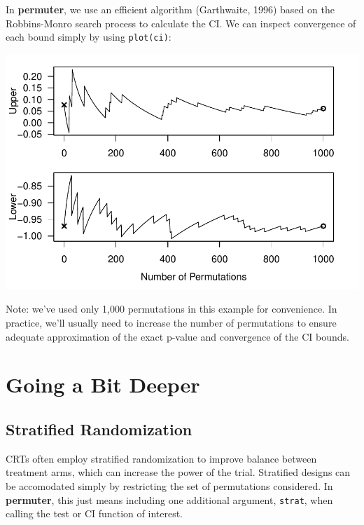 \documentclass[12pt]{article}\usepackage[]{graphicx}\usepackage[]{color}
\makeatletter
\def\maxwidth{ %
  \ifdim\Gin@nat@width>\linewidth
    \linewidth
  \else
    \Gin@nat@width
  \fi
}
\newenvironment{knitrout}{}{} %
\makeatother
\begin{document}
In \textbf{permuter}, we use an efficient algorithm (Garthwaite, 1996) based on the Robbins-Monro search process to calculate the CI. We can inspect convergence of each bound simply by using \texttt{plot(ci)}:
\begin{knitrout}
\color{fgcolor}

{\centering \includegraphics[width=\maxwidth]{figure/plot-1} 

}



\end{knitrout}
Note: we've used only 1,000 permutations in this example for convenience. In practice, we'll usually need to increase the number of permutations to ensure adequate approximation of the exact p-value and convergence of the CI bounds.

\section{Going a Bit Deeper}

\subsection{Stratified Randomization}
CRTs often employ stratified randomization to improve balance between treatment arms, which can increase the power of the trial. Stratified designs can be accomodated simply by restricting the set of permutations considered. In \textbf{permuter}, this just means including one additional argument, \texttt{strat}, when calling the test or CI function of interest.
\end{document}
